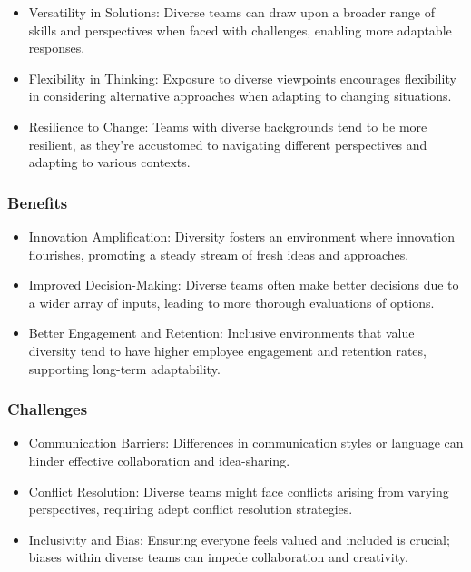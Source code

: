 \documentclass[a4paper, twoside]{article}
\begin{document}
\begin{itemize}
    \item{Versatility in Solutions:} Diverse teams can draw upon a broader range of skills and perspectives when faced with challenges, enabling more adaptable responses.
    
    \item{Flexibility in Thinking:} Exposure to diverse viewpoints encourages flexibility in considering alternative approaches when adapting to changing situations.
    
    \item{Resilience to Change:} Teams with diverse backgrounds tend to be more resilient, as they're accustomed to navigating different perspectives and adapting to various contexts.
\end{itemize}

\subsubsection{Benefits}

\begin{itemize}
    \item{Innovation Amplification:} Diversity fosters an environment where innovation flourishes, promoting a steady stream of fresh ideas and approaches.
    
    \item{Improved Decision-Making:} Diverse teams often make better decisions due to a wider array of inputs, leading to more thorough evaluations of options.
    
    \item{Better Engagement and Retention:} Inclusive environments that value diversity tend to have higher employee engagement and retention rates, supporting long-term adaptability.
\end{itemize}

\subsubsection{Challenges}

\begin{itemize}
    \item{Communication Barriers:} Differences in communication styles or language can hinder effective collaboration and idea-sharing.
    
    \item{Conflict Resolution:} Diverse teams might face conflicts arising from varying perspectives, requiring adept conflict resolution strategies.
    
    \item{Inclusivity and Bias:} Ensuring everyone feels valued and included is crucial; biases within diverse teams can impede collaboration and creativity.
\end{itemize}
\end{document}
